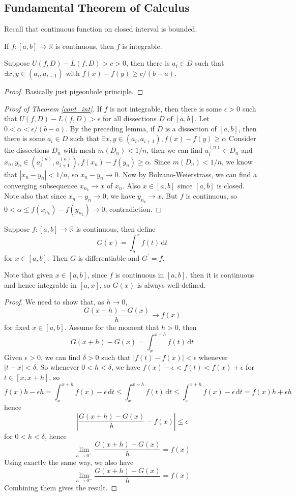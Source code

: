 \subsection{Fundamental Theorem of Calculus}
Recall that continuous function on closed interval is bounded.
\begin{theorem}\label{cont_int}
    If $f:[a,b]\to\mathbb R$ is continuous, then $f$ is integrable.
\end{theorem}
\begin{lemma}
    Suppose $U(f,D)-L(f,D)>c>0$, then there is $a_i\in D$ such that $\exists x,y\in (a_i,a_{i+1})$ with $f(x)-f(y)\ge c/(b-a)$.
\end{lemma}
\begin{proof}
    Basically just pigeonhole principle.
\end{proof}
\begin{proof}[Proof of Theorem \ref{cont_int}]
    If $f$ is not integrable, then there is some $\epsilon>0$ such that $U(f,D)-L(f,D)>\epsilon$ for all dissections $D$ of $[a,b]$.
    Let $0<\alpha<\epsilon/(b-a)$.
    By the preceding lemma, if $D$ is a dissection of $[a,b]$, then there is some $a_i\in D$ such that $\exists x,y\in (a_i,a_{i+1}),f(x)-f(y)\ge\alpha$
    Consider the dissections $D_n$ with mesh $m(D_n)<1/n$, then we can find $a_i^{(n)}\in D_n$ and $x_n,y_n\in (a_i^{(n)},a_{i+1}^{(n)}),f(x_n)-f(y_n)\ge\alpha$.
    Since $m(D_n)<1/n$, we know that $|x_n-y_n|<1/n$, so $x_n-y_n\to 0$.
    Now by Bolzano-Weierstrass, we can find a converging subsequence $x_{n_k}\to x$ of $x_n$.
    Also $x\in [a,b]$ since $[a,b]$ is closed.
    Note also that since $x_n-y_n\to 0$, we have $y_{n_k}\to x$.
    But $f$ is continuous, so $0<\alpha\le f(x_{n_k})-f(y_{n_k})\to 0$, contradiction.
\end{proof}
\begin{theorem}
    Suppose $f:[a,b]\to\mathbb R$ is continuous, then define
    $$G(x)=\int_a^xf(t)\,\mathrm dt$$
    for $x\in [a,b]$.
    Then $G$ is differentiable and $G^\prime=f$.
\end{theorem}
Note that given $x\in [a,b]$, since $f$ is continuous in $[a,b]$, then it is continuous and hence integrable in $[a,x]$, so $G(x)$ is always well-defined.
\begin{proof}
    We need to show that, as $h\to 0$,
    $$\frac{G(x+h)-G(x)}{h}\to f(x)$$
    for fixed $x\in[a,b]$.
    Assume for the moment that $h>0$, then
    $$G(x+h)-G(x)=\int_x^{x+h}f(t)\,\mathrm dt$$
    Given $\epsilon>0$, we can find $\delta>0$ such that $|f(t)-f(x)|<\epsilon$ whenever $|t-x|<\delta$.
    So whenever $0<h<\delta$, we have $f(x)-\epsilon<f(t)<f(x)+\epsilon$ for $t\in [x,x+h]$, so
    $$f(x)h-\epsilon h=\int_x^{x+h}f(x)-\epsilon\,\mathrm dt\le\int_{x}^{x+h}f(t)\,\mathrm dt\le\int_x^{x+h}f(x)-\epsilon\,\mathrm dt=f(x)h+\epsilon h$$
    hence
    $$\left|\frac{G(x+h)-G(x)}{h}-f(x)\right|\le\epsilon$$
    for $0<h<\delta$, hence
    $$\lim_{h\to 0^+}\frac{G(x+h)-G(x)}{h}=f(x)$$
    Using exactly the same way, we also have
    $$\lim_{h\to 0^-}\frac{G(x+h)-G(x)}{h}=f(x)$$
    Combining them gives the result.
\end{proof}
